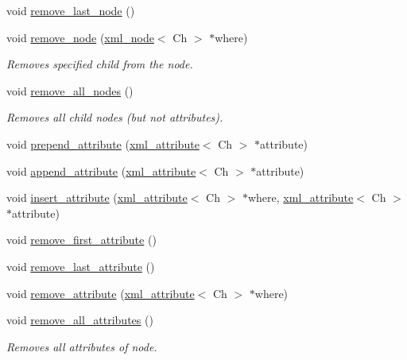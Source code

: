 \begin{DoxyCompactItemize}
\item 
void \hyperlink{classrapidxml_1_1xml__node_a9182512e948ec451a83f116cce7c7674}{remove\+\_\+last\+\_\+node} ()
\item 
void \hyperlink{classrapidxml_1_1xml__node_a98289923eb9e8889418a9eb0207ea35c}{remove\+\_\+node} (\hyperlink{classrapidxml_1_1xml__node}{xml\+\_\+node}$<$ Ch $>$ $\ast$where)
\begin{DoxyCompactList}\small\item\em Removes specified child from the node. \end{DoxyCompactList}\item 
void \hyperlink{classrapidxml_1_1xml__node_a95735358b079ae0adcfbbac69aa1fbc3}{remove\+\_\+all\+\_\+nodes} ()
\begin{DoxyCompactList}\small\item\em Removes all child nodes (but not attributes). \end{DoxyCompactList}\item 
void \hyperlink{classrapidxml_1_1xml__node_a8b62ee76489faf8e2d1210869d547684}{prepend\+\_\+attribute} (\hyperlink{classrapidxml_1_1xml__attribute}{xml\+\_\+attribute}$<$ Ch $>$ $\ast$attribute)
\item 
void \hyperlink{classrapidxml_1_1xml__node_a33ce3386f8c42dd4db658b75cbb6e6c4}{append\+\_\+attribute} (\hyperlink{classrapidxml_1_1xml__attribute}{xml\+\_\+attribute}$<$ Ch $>$ $\ast$attribute)
\item 
void \hyperlink{classrapidxml_1_1xml__node_a9fe659cdf4a5b3bbf5e8ffc98db5a84f}{insert\+\_\+attribute} (\hyperlink{classrapidxml_1_1xml__attribute}{xml\+\_\+attribute}$<$ Ch $>$ $\ast$where, \hyperlink{classrapidxml_1_1xml__attribute}{xml\+\_\+attribute}$<$ Ch $>$ $\ast$attribute)
\item 
void \hyperlink{classrapidxml_1_1xml__node_aa95192d2a165cca16c551ed2a2a06aec}{remove\+\_\+first\+\_\+attribute} ()
\item 
void \hyperlink{classrapidxml_1_1xml__node_a1781a2cbedc9a51d609ad5b528125635}{remove\+\_\+last\+\_\+attribute} ()
\item 
void \hyperlink{classrapidxml_1_1xml__node_a6f97b1b4f46a94a4587915df3c0c6b57}{remove\+\_\+attribute} (\hyperlink{classrapidxml_1_1xml__attribute}{xml\+\_\+attribute}$<$ Ch $>$ $\ast$where)
\item 
void \hyperlink{classrapidxml_1_1xml__node_aa8d5d9484aa1eb5ff1841a073c84c1aa}{remove\+\_\+all\+\_\+attributes} ()
\begin{DoxyCompactList}\small\item\em Removes all attributes of node. \end{DoxyCompactList}\item 

\end{DoxyCompactItemize}
